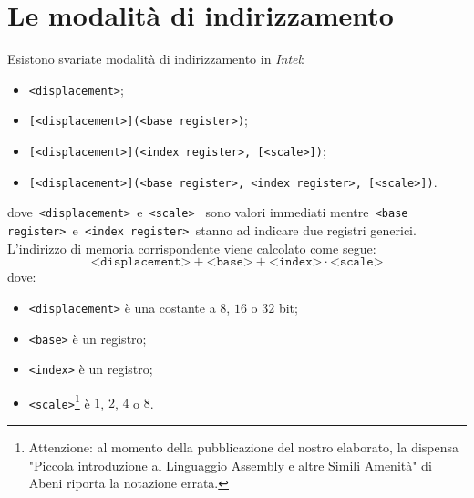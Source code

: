 \documentclass[class=book, crop=false, oneside]{standalone}
\begin{document}
\section{Le modalità di indirizzamento}
Esistono svariate modalità di indirizzamento in \emph{Intel}:
\begin{itemize}
	\item \texttt{<displacement>};
	\item \texttt{[<displacement>](<base register>)};
	\item \texttt{[<displacement>](<index register>, [<scale>])};
	\item \texttt{[<displacement>](<base register>, <index register>, [<scale>])}.
\end{itemize}
dove\texttt{ <displacement> }e\texttt{ <scale> } sono valori immediati mentre\texttt{ <base register> }e\texttt{ <index register> }stanno ad indicare due registri generici. L'indirizzo di memoria corrispondente viene calcolato come segue:
\begin{equation*}
	\texttt{<displacement>} + \texttt{<base>} + \texttt{<index>} \cdot\texttt{<scale>}
\end{equation*}
dove:
\begin{itemize}
	\item \texttt{<displacement>} è una costante a \(8\), \(16\) o \(32\) bit;
	\item \texttt{<base>} è un registro;
	\item \texttt{<index>} è un registro;
	\item \texttt{<scale>}\footnote{Attenzione: al momento della pubblicazione del nostro elaborato, la dispensa "Piccola introduzione al Linguaggio Assembly e altre Simili Amenità" di Abeni riporta la notazione errata.} è \(1\), \(2\), \(4\) o \(8\).
\end{itemize}
\end{document}
